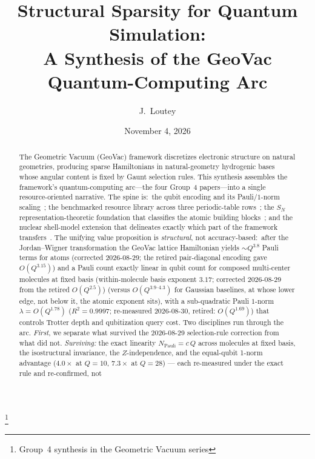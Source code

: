 \documentclass[aps,pra,twocolumn,superscriptaddress,longbibliography]{revtex4-2}
\begin{document}
\title{Structural Sparsity for Quantum Simulation:\\
A Synthesis of the GeoVac Quantum-Computing Arc}
\thanks{Group~4 synthesis in the Geometric Vacuum series}

\author{J.~Loutey}

\date{November 4, 2026}


\begin{abstract}
The Geometric Vacuum (GeoVac) framework discretizes electronic
structure on natural geometries, producing sparse Hamiltonians in
natural-geometry hydrogenic bases whose angular content is fixed by Gaunt selection rules.  This synthesis
assembles the framework's quantum-computing arc---the four Group~4
papers---into a single resource-oriented narrative.  The spine is:\ the
qubit encoding and its Pauli/$1$-norm scaling~\cite{loutey_paper14}; the
benchmarked resource library across three periodic-table
rows~\cite{loutey_paper20}; the $S_N$ representation-theoretic
foundation that classifies the atomic building
blocks~\cite{loutey_paper16}; and the nuclear shell-model extension that
delineates exactly which part of the framework
transfers~\cite{loutey_paper23}.  The unifying value proposition is
\emph{structural}, not accuracy-based:\ after the Jordan--Wigner
transformation the GeoVac lattice Hamiltonian yields $\sim Q^{3.8}$ Pauli
terms for atoms (corrected 2026-08-29; the retired pair-diagonal encoding
gave $O(Q^{3.15})$) and a Pauli count exactly linear in qubit count for
composed multi-center molecules at fixed basis (within-molecule basis
exponent $3.17$; corrected 2026-08-29 from the retired $O(Q^{2.5})$)
(versus $O(Q^{3.9\text{--}4.3})$ for Gaussian baselines, at whose
lower edge, not below it, the atomic exponent sits), with a
sub-quadratic Pauli $1$-norm $\lambda = O(Q^{1.78})$ ($R^2=0.9997$;
re-measured 2026-08-30, retired: $O(Q^{1.69})$) that
controls Trotter depth and qubitization query cost.  Two disciplines run
through the arc.  \emph{First}, we separate what survived the
2026-08-29 selection-rule correction from what did not.  \emph{Surviving:}
the exact linearity $N_{\mathrm{Pauli}} = c\,Q$ across molecules at fixed
basis, the isostructural invariance, the $Z$-independence, and the
equal-qubit 1-norm advantage ($4.0\times$ at $Q=10$, $7.3\times$ at
$Q=28$) --- each re-measured under the exact rule and re-confirmed, not

\end{abstract}
\end{document}
